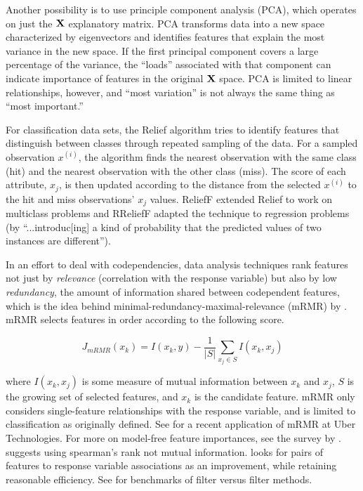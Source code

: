 \documentclass[11pt]{article}
\renewcommand{\xi}{x^{(i)}}
\begin{document}
Another possibility is to use principle component analysis (PCA), which operates on just the $\bf X$ explanatory matrix. PCA transforms data into a new space characterized by eigenvectors and identifies features that explain the most variance in the new space. If the first principal component covers a large percentage of the variance, the ``loads'' associated with that component can indicate importance of features in the original $\bf X$ space. PCA is limited to linear relationships, however, and ``most variation'' is not always the same thing as ``most important.''

For classification data sets, the Relief algorithm \citep{relief} tries to identify features that distinguish between classes through repeated sampling of the data. For a sampled observation $\xi$, the algorithm finds the nearest observation with the same class (hit) and the nearest observation with the other class (miss). The score of each attribute, $x_j$, is then updated according to the distance from the selected $\xi$ to the hit and miss observations'  $x_j$ values. ReliefF \citep{ReliefF} extended Relief to work on multiclass problems and RReliefF \citep{RReliefF} adapted the technique to regression problems (by ``...introduc[ing] a kind of probability that the predicted values of two instances are different'').

In an effort to deal with codependencies, data analysis techniques rank features not just by {\em relevance} (correlation with the response variable) but also by low {\em redundancy}, the amount of information shared between codependent features, which is the idea behind minimal-redundancy-maximal-relevance (mRMR) by \citep{mRMR}. mRMR selects features in order according to the following score.

\[
J_{mRMR}(x_k) = I(x_k, y) - \frac{1}{|S|} \sum_{x_j \in S} I(x_k, x_j)
\]

\noindent where $I(x_k, x_j)$ is some measure of mutual information between $x_k$ and $x_j$, $S$ is the growing set of selected features, and $x_k$ is the candidate feature. mRMR only considers single-feature relationships with the response variable, and is limited to classification as originally defined. See \citep{ubermRMR} for a recent application of mRMR at Uber Technologies.  For more on model-free feature importances, see the survey by \citep{survey}.  \citet{tsanas} suggests using spearman's rank not mutual information. \citet{meyer-microarray} looks for pairs of features to response variable associations as an improvement, while retaining reasonable efficiency. See \citet{filter-benchmark} for benchmarks of filter versus filter methods.
\end{document}
